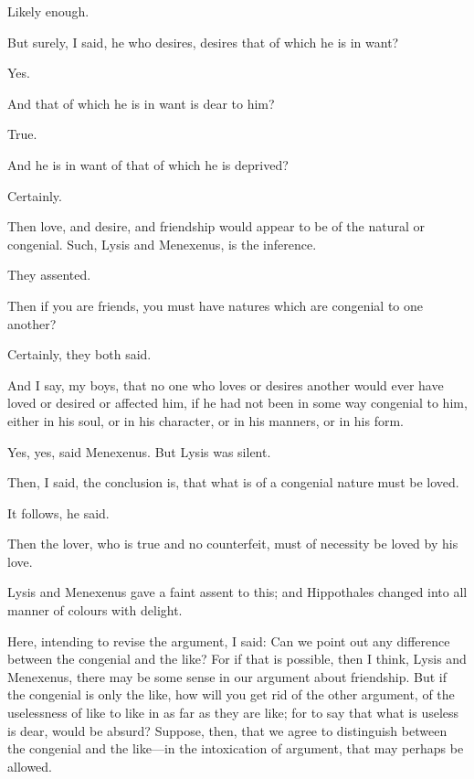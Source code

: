 \documentclass[11pt,letter]{article}
\begin{document}
\par  Likely enough.

\par  But surely, I said, he who desires, desires that of which he is in want?

\par  Yes.

\par  And that of which he is in want is dear to him?

\par  True.

\par  And he is in want of that of which he is deprived?

\par  Certainly.

\par  Then love, and desire, and friendship would appear to be of the natural or congenial. Such, Lysis and Menexenus, is the inference.

\par  They assented.

\par  Then if you are friends, you must have natures which are congenial to one another?

\par  Certainly, they both said.

\par  And I say, my boys, that no one who loves or desires another would ever have loved or desired or affected him, if he had not been in some way congenial to him, either in his soul, or in his character, or in his manners, or in his form.

\par  Yes, yes, said Menexenus. But Lysis was silent.

\par  Then, I said, the conclusion is, that what is of a congenial nature must be loved.

\par  It follows, he said.

\par  Then the lover, who is true and no counterfeit, must of necessity be loved by his love.

\par  Lysis and Menexenus gave a faint assent to this; and Hippothales changed into all manner of colours with delight.

\par  Here, intending to revise the argument, I said: Can we point out any difference between the congenial and the like? For if that is possible, then I think, Lysis and Menexenus, there may be some sense in our argument about friendship. But if the congenial is only the like, how will you get rid of the other argument, of the uselessness of like to like in as far as they are like; for to say that what is useless is dear, would be absurd? Suppose, then, that we agree to distinguish between the congenial and the like—in the intoxication of argument, that may perhaps be allowed.
\end{document}
